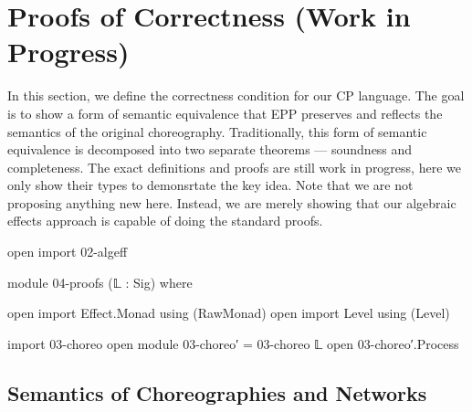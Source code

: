 \section{Proofs of Correctness (Work in Progress)}





In this section, we define the correctness condition for our CP language.
%
The goal is to show a form of semantic equivalence that EPP preserves and reflects the semantics of the original choreography.
%
Traditionally, this form of semantic equivalence is decomposed into two separate theorems --- soundness and completeness.
%
The exact definitions and proofs are still work in progress, here we only show their types to demonsrtate the key idea.
%
Note that we are not proposing anything new here.
%
Instead, we are merely showing that our algebraic effects approach is capable of doing the standard proofs.

\begin{code}[hide]
open import 02-algeff

module 04-proofs (𝕃 : Sig) where

open import Effect.Monad using (RawMonad)
open import Level using (Level)

import 03-choreo
open module 03-choreo′ = 03-choreo 𝕃
open 03-choreo′.Process
\end{code}

\subsection{Semantics of Choreographies and Networks}

